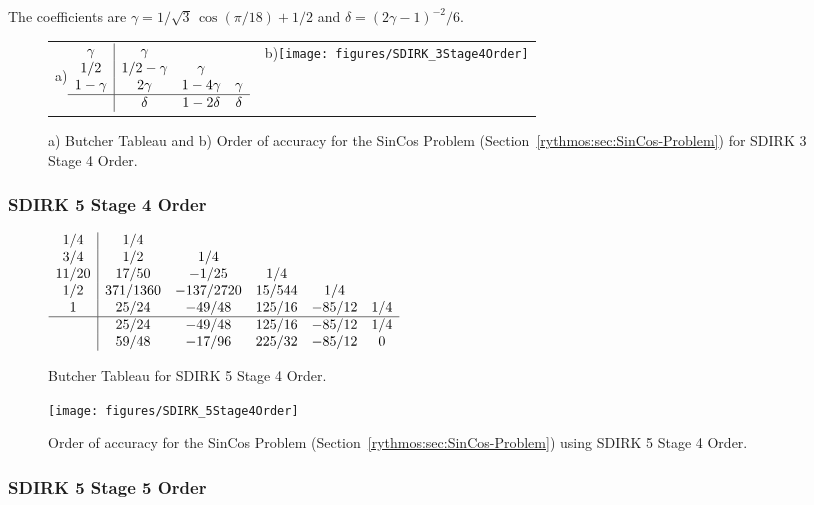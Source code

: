 The coefficients are $\gamma=1/\sqrt{3}\,\cos(\pi/18)+1/2$ and $\delta=(2\gamma-1)^{-2}/6$.

\begin{figure}[H]
\centering{}%
\begin{tabular}{cc}
a)$\begin{array}{c|ccc}
\gamma & \gamma\\
1/2 & 1/2-\gamma & \gamma\\
1-\gamma & 2\gamma & 1-4\gamma & \gamma\\
\hline  & \delta & 1-2\delta & \delta
\end{array}$ & b)\texttt{[image: figures/SDIRK\_3Stage4Order]}\tabularnewline
\end{tabular}\caption{a) Butcher Tableau and b) Order of accuracy for the SinCos Problem
(Section~\ref{rythmos:sec:SinCos-Problem}) for SDIRK 3 Stage 4 Order.}
\end{figure}


\subsubsection{SDIRK 5 Stage 4 Order}

\begin{figure}[H]
\centering{}$\begin{array}{c|ccccc}
1/4 & 1/4\\
3/4 & 1/2 & 1/4\\
11/20 & 17/50 & -1/25 & 1/4\\
1/2 & 371/1360 & -137/2720 & 15/544 & 1/4\\
1 & 25/24 & -49/48 & 125/16 & -85/12 & 1/4\\
\hline  & 25/24 & -49/48 & 125/16 & -85/12 & 1/4\\
 & 59/48 & -17/96 & 225/32 & -85/12 & 0
\end{array}$\caption{Butcher Tableau for SDIRK 5 Stage 4 Order.}
\end{figure}
\begin{figure}[H]
\centering{}\texttt{[image: figures/SDIRK\_5Stage4Order]}\caption{Order of accuracy for the SinCos Problem (Section~\ref{rythmos:sec:SinCos-Problem})
using SDIRK 5 Stage 4 Order.}
\end{figure}


\subsubsection{SDIRK 5 Stage 5 Order}

